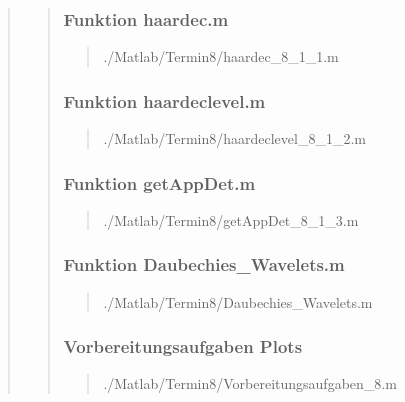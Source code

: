 \begin{quote}
\begin{quote}
       \subsubsection{Funktion haardec.m}
       \begin{quote}
       
                {./Matlab/Termin8/haardec_8_1_1.m}
       \end{quote}
       
       \subsubsection{Funktion haardeclevel.m}
       \begin{quote}
       
                {./Matlab/Termin8/haardeclevel_8_1_2.m}
       \end{quote}
       
       \subsubsection{Funktion getAppDet.m}
       \begin{quote}
       
                {./Matlab/Termin8/getAppDet_8_1_3.m}
       \end{quote}
       
       \subsubsection{Funktion Daubechies\_Wavelets.m}
       \begin{quote}
       
                {./Matlab/Termin8/Daubechies_Wavelets.m}
       \end{quote}
       
       
       \subsubsection{Vorbereitungsaufgaben Plots}
       \begin{quote}
       
                {./Matlab/Termin8/Vorbereitungsaufgaben_8.m}
       \end{quote}
\end{quote}


\end{quote}
